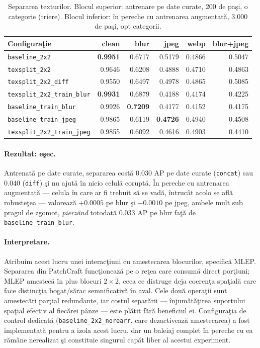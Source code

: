 \begin{table}[t]
  \centering
  \caption{Separarea texturilor. Blocul superior: antrenare pe date curate, 200
  de paşi, o categorie (triere). Blocul inferior: în pereche cu antrenarea
  augmentată, 3{,}000 de paşi, opt categorii.}
  \label{tab:texture}
  \begin{tabular}{lrrrrr}
    \toprule
    Configuraţie & clean & blur & jpeg & webp & blur+jpeg \\
    \midrule
    \texttt{baseline\_2x2}            & \textbf{0.9951} & 0.6717 & 0.5179 & 0.4866 & 0.5047 \\
    \texttt{texsplit\_2x2}            & 0.9646 & 0.6208 & 0.4888 & 0.4710 & 0.4863 \\
    \texttt{texsplit\_2x2\_diff}      & 0.9550 & 0.6497 & 0.4978 & 0.4865 & 0.5085 \\
    \midrule
    \texttt{texsplit\_2x2\_train\_blur} & \textbf{0.9931} & 0.6879 & 0.4188 & 0.4174 & 0.4225 \\
    \texttt{baseline\_train\_blur}      & 0.9926 & \textbf{0.7209} & 0.4177 & 0.4152 & 0.4175 \\
    \texttt{baseline\_train\_jpeg}      & 0.9865 & 0.6119 & \textbf{0.4726} & 0.4940 & 0.4508 \\
    \texttt{texsplit\_2x2\_train\_jpeg} & 0.9855 & 0.6092 & 0.4616 & 0.4903 & 0.4410 \\
    \bottomrule
  \end{tabular}
\end{table}

\paragraph{Rezultat: eşec.} Antrenată pe date curate, separarea costă $0.030$ AP
pe date curate (\texttt{concat}) sau $0.040$ (\texttt{diff}) şi nu ajută în
nicio celulă coruptă. În pereche cu antrenarea augmentată --- celula în care ar
fi trebuit să se vadă, întrucât acolo se află robusteţea --- valorează $+0.0005$
pe blur şi $-0.0010$ pe jpeg, ambele mult sub pragul de zgomot, \emph{pierzând}
totodată $0.033$ AP pe blur faţă de \texttt{baseline\_train\_blur}.

\paragraph{Interpretare.} Atribuim acest lucru unei interacţiuni cu amestecarea
blocurilor, specifică MLEP. Separarea din PatchCraft funcţionează pe o reţea care
consumă direct porţiuni; MLEP amestecă în plus blocuri $2\times2$, ceea ce
distruge deja coerenţa spaţială care face distincţia bogat/sărac semnificativă în
aval. Cele două operaţii sunt amestecări parţial redundante, iar costul separării
--- înjumătăţirea suportului spaţial efectiv al fiecărei pânze --- este plătit
fără beneficiul ei. Configuraţia de control dedicată
(\texttt{baseline\_2x2\_norearr}, care dezactivează amestecarea) a fost
implementată pentru a izola acest lucru, dar un baleiaj complet în pereche cu ea
rămâne nerealizat şi constituie singurul capăt liber al acestui experiment.

